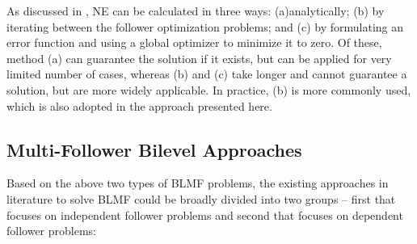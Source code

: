 As discussed in \cite{liu1998stackelberg}, NE can be calculated in three ways: (a)analytically; (b)
by iterating between the follower optimization problems; and (c) by formulating an error function
and using a global optimizer to minimize it to zero. Of these, method (a) can guarantee the solution
if it exists, but can be applied for very limited number of cases, whereas (b) and (c) take longer
and cannot guarantee a solution, but are more widely applicable. In practice, (b) is more commonly
used, which is also adopted in the approach presented here.

\subsection{Multi-Follower Bilevel Approaches}
\label{multi_follower_ch_2}

Based on the above two types of
BLMF problems, the existing approaches in literature to solve BLMF could be broadly divided into two
groups -- first that focuses on independent follower problems and second that focuses on dependent
follower problems:

